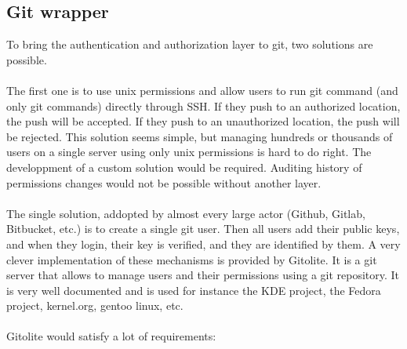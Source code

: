 \subsection{Git wrapper}

To bring the authentication and authorization layer to git, two solutions are possible. 

\paragraph{}
The first one is to use unix permissions and allow users to run git command (and only git commands) directly through SSH. If they push to an authorized location, the push will be accepted. If they push to an unauthorized location, the push will be rejected. This solution seems simple, but managing hundreds or thousands of users on a single server using only unix permissions is hard to do right. The developpment of a custom solution would be required. Auditing history of permissions changes would not be possible without another layer.  

\paragraph{}
The single solution, addopted by almost every large actor (Github, Gitlab, Bitbucket, etc.) is to create a single git user. Then all users add their public keys, and when they login, their key is verified, and they are identified by them. A very clever implementation of these mechanisms is provided by Gitolite. It is a git server that allows to manage users and their permissions using a git repository. It is very well documented and is used for instance the KDE project, the Fedora project, kernel.org, gentoo linux, etc.

\paragraph{}
Gitolite would satisfy a lot of requirements:

